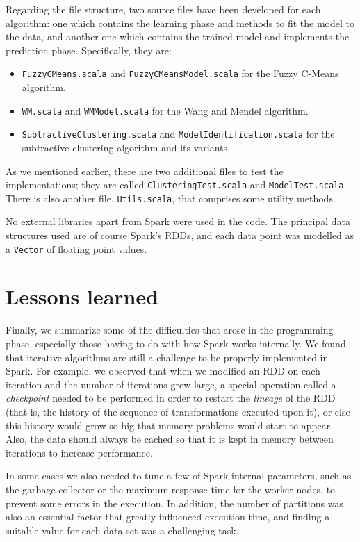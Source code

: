 Regarding the file structure, two source files have been developed for each algorithm: one which contains the learning phase and methods to fit the model to the data, and another one which contains the trained model and implements the prediction phase. Specifically, they are:

\begin{itemize}
  \item \verb|FuzzyCMeans.scala| and \verb|FuzzyCMeansModel.scala| for the Fuzzy C-Means algorithm.
  \item \verb|WM.scala| and \verb|WMModel.scala| for the Wang and Mendel algorithm.
  \item \verb|SubtractiveClustering.scala| and \verb|ModelIdentification.scala| for the subtractive clustering algorithm and its variants.
\end{itemize}
As we mentioned earlier, there are two additional files to test the implementations; they are called \verb|ClusteringTest.scala| and \verb|ModelTest.scala|. There is also another file, \verb|Utils.scala|, that comprises some utility methods.

No external libraries apart from Spark were used in the code. The principal data structures used are of course Spark's RDDs, and each data point was modelled as a \verb|Vector| of floating point values.

\section*{Lessons learned}

Finally, we summarize some of the difficulties that arose in the programming phase, especially those having to do with how Spark works internally. We found that iterative algorithms are still a challenge to be properly implemented in Spark. For example, we observed that when we modified an RDD on each iteration and the number of iterations grew large, a special operation called a \textit{checkpoint} needed to be performed in order to restart the \textit{lineage} of the RDD (that is, the history of the sequence of transformations executed upon it), or else this history would grow so big that memory problems would start to appear. Also, the data should always be cached so that it is kept in memory between iterations to increase performance.

In some cases we also needed to tune a few of Spark internal parameters, such as the garbage collector or the maximum response time for the worker nodes, to prevent some errors in the execution. In addition, the number of partitions was also an essential factor that greatly influenced execution time, and finding a suitable value for each data set was a challenging task.
